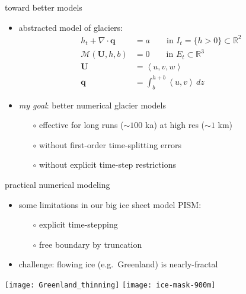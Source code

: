 \documentclass[xcolor={dvipsnames}]{beamer}
\newcommand\bq{\mathbf{q}}
\newcommand\bU{\mathbf{U}}
\newcommand\RR{\mathbb{R}}
\newcommand\Div{\nabla\cdot}
\begin{document}
\begin{frame}{toward better models}

\begin{itemize}
\item abstracted model of glaciers:
\begin{align*}
h_t + \Div\bq &= a \qquad \text{in } I_t = \{h>0\} \subset \RR^2 \\
\mathcal{M}(\bU,h,b) &= 0 \qquad \text{in } E_t \subset \RR^3 \\
\bU &= \left<u,v,w\right> \\
\bq &= \int_b^{h+b} \left<u,v\right>\,dz
\end{align*}

\medskip
\item \emph{my goal}: better numerical glacier models
  \begin{itemize}
  \item[$\circ$] effective for long runs ($\sim 100$ ka) at high res ($\sim 1$ km) 
  \item[$\circ$] without first-order time-splitting errors 
  \item[$\circ$] without explicit time-step restrictions 
  \end{itemize}

\medskip
{}
\end{itemize}
\end{frame}


\begin{frame}{practical numerical modeling}

\begin{itemize}
\small
\item some limitations in our big ice sheet model PISM:
  \begin{itemize}
  \item[$\circ$] explicit time-stepping
  \item[$\circ$] free boundary by truncation
  \end{itemize}
\item challenge: flowing ice (e.g.~Greenland) is nearly-fractal
\end{itemize}

\begin{center}
\texttt{[image: Greenland\_thinning]} \quad \texttt{[image: ice-mask-900m]}
\end{center}
\end{frame}
\end{document}
